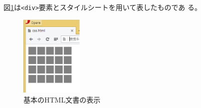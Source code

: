\documentclass[a4j,12pt]{jreport}
\begin{document}
\begin{Prob}\upshape
  図\ref{css1}は\texttt{<div>}要素とスタイルシートを用いて表したものであ
 る。
 \begin{figure}[htb]
  \begin{center}
 \includegraphics[width=3cm]{css1.eps}
  \end{center}
 \caption{基本のHTML文書の表示}\label{css1}
 \end{figure}


\end{Prob}
\end{document}
